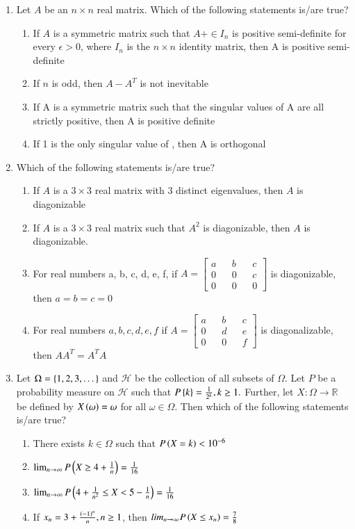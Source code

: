 \documentclass[journal,12pt,onecolumn]{IEEEtran}
\theoremstyle{remark}
\begin{document}
\begin{enumerate}
\item Let $A$ be an $n \times n $ real matrix. Which of the following statements is/are true?
\begin{enumerate}
\item If $A$ is a symmetric matrix such that $A + \in I_{n}$ is positive semi-definite for every $\epsilon > 0$, where $I_{n}$ is the $n \times n $  identity matrix, then A is positive semi-definite
\item If $n$ is odd, then $A - A^{T}$ is not inevitable
\item If A is a symmetric matrix such that the singular values of A are all strictly positive, then A is positive definite
\item If 1 is the only singular value of , then A is orthogonal
\end{enumerate}

\item Which of the following statements is/are true?
\begin{enumerate}
\item If $A$ is a $ 3 \times 3 $ real matrix with 3 distinct eigenvalues, then $A$ is diagonizable 
\item If $A$ is a $3 \times 3$ real matrix such that $A^{2}$ is diagonizable, then $A$ is diagonizable.
\item For real numbers a, b, c, d, e, f, if $A = \begin{bmatrix} a && b && c \\ 0 && 0 && c \\ 0 && 0 && 0 \end{bmatrix}$  is diagonizable, then $a=b=c=0$
\item For real numbers $a, b, c, d, e, f$ if $A= \begin{bmatrix} a && b && c \\ 0 && d && e \\ 0 && 0 && f \end{bmatrix}$ is diagonalizable, then $AA^{T} = A^{T}A$
\end{enumerate}

\item Let $\Omega = \left\{1, 2, 3, \dots \right\}$ and $\mathcal{H}$ be the collection of all subsets of $\Omega$. Let $P$ be a probability measure on $\mathcal{H}$ such that $P\left\{k\right\} = \frac{1}{2^{k}}, k \geq 1. $ Further, let $X: \Omega \rightarrow \mathbb{R}$ be defined by $X\left(\omega\right) = \omega $ for all $\omega \in \Omega $. Then which of the following statements is/are true?
\begin{enumerate}
\item There exists $k \in \Omega $ such that $P\left(X = k\right) < 10^{-6}$
\item $\lim_{n \to \infty} P\left(X \geq 4 + \frac{1}{n}\right) = \frac{1}{16}$
\item $\lim_{n \to \infty} P\left( 4 + \frac{1}{n^{2}} \leq X < 5 - \frac{1}{n} \right)= \frac{1}{16}$
\item If $x_{n} = 3 + \frac{ \left(-1\right)^{n}}{n}, n \geq 1$, then $lim_{n \to \infty}P\left(X \leq x_{n} \right) = \frac{7}{8}$
\end{enumerate}



\end{enumerate}
\end{document}
